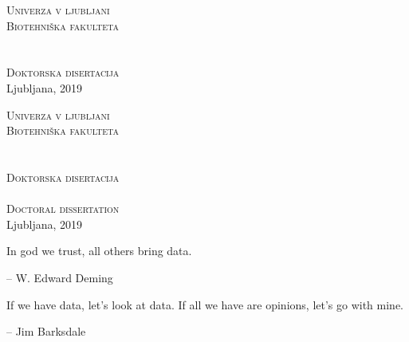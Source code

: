 \begin{titlepage}
\voffset -2cm
\enlargethispage{2cm}
\begin{center}
\Large\textsc{Univerza v ljubljani} \\
\Large\textsc{Biotehniška fakulteta} \\
\vspace{7cm}
\Large\avtor \\
\vspace{2cm}
\LARGE\platnica \\
\vspace{2cm}
\Large \textsc{Doktorska disertacija}\\
\vspace{8cm} %
\Large Ljubljana, 2019 \\
\end{center}
\end{titlepage}

\begin{titlepage}
\voffset -2cm
\enlargethispage{2cm}
\begin{center}
\Large\textsc{Univerza v ljubljani}\\
\Large\textsc{Biotehniška fakulteta}\\
\vspace{6cm}
\avtor \\
\vspace{1cm}
\large \platnica\\
\vspace{0.8cm}
\textsc{Doktorska disertacija}\\
\vspace{2cm}
\large\platnicaEN\\
\vspace{0.8cm}
\textsc{Doctoral dissertation}\\
\vspace{8cm} %
\Large Ljubljana, 2019 \\
\end{center}
\end{titlepage}

\begin{titlepage}
\epigraph{In god we trust, all others bring data.}{-- W. Edward Deming}
\epigraph{If we have data, let’s look at data. If all we have are opinions, let’s go with mine.}{-- Jim Barksdale}
\end{titlepage}

